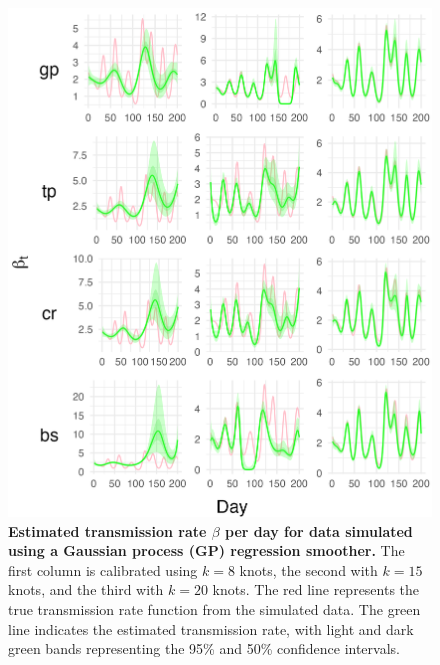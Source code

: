 \documentclass[
11pt, %
oneside, %
english, %
singlespacing, %
]{macthesis} %
\begin{document}
\begin{figure}[H]
\centering
\includegraphics[width=\textwidth]{figure/Simulated/simulation_gp(-2,2,1)_k(20)_k(8,15,20)_bsd2_beta2_plot_beta.png}
\caption[Estimated Simulated Data (GP) Transmission Rate]{\textbf{Estimated transmission rate \(\beta\) per day for data simulated using a Gaussian process (GP) regression smoother.} The first column is calibrated using \(k=8\) knots, the second with \(k=15\) knots, and the third with \(k=20\) knots. The red line represents the true transmission rate function from the simulated data. The green line indicates the estimated transmission rate, with light and dark green bands representing the 95\% and 50\% confidence intervals.}
\label{fig:transmission20gp}
\end{figure}
\end{document}
